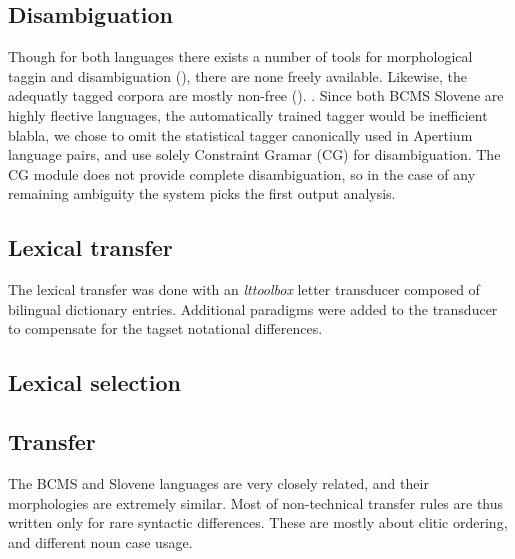 \subsection{Disambiguation}
Though for both languages there exists a number of tools for
morphological taggin and disambiguation (), there
are none freely available. Likewise, the adequatly tagged corpora are
mostly non-free (). .
Since both BCMS Slovene are highly flective languages, the
automatically trained tagger would be inefficient blabla, we chose to omit the
statistical tagger canonically used in Apertium language pairs, and
use solely Constraint Gramar (CG) for disambiguation. The CG module
does not provide complete disambiguation, so in the case of any
remaining ambiguity the system picks the first output analysis.


\subsection{Lexical transfer}
The lexical transfer was done with an \emph{lttoolbox} letter
transducer composed of bilingual dictionary entries. Additional
paradigms were added to the transducer to compensate for the tagset
notational differences.

\subsection{Lexical selection}


\subsection{Transfer}
The BCMS and Slovene languages are very closely related, and their
morphologies are extremely similar. Most of non-technical transfer
rules are thus written only for rare syntactic differences. These are
mostly about clitic ordering, and different noun case usage.

